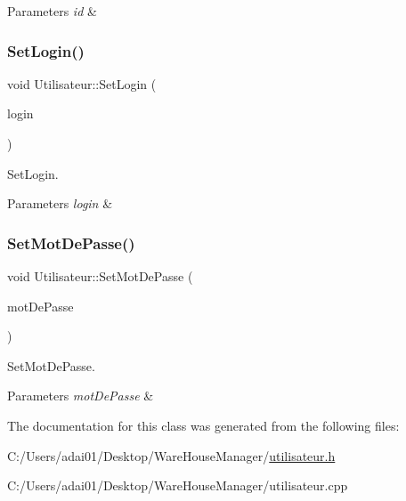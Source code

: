 \begin{DoxyParams}{Parameters}
{\em id} & \\
\hline
\end{DoxyParams}
\mbox{\label{class_utilisateur_a0bf37c85322764c3b094acd66aacec64}} 
\subsubsection{\texorpdfstring{Set\+Login()}{SetLogin()}}
{\footnotesize\ttfamily void Utilisateur\+::\+Set\+Login (\begin{DoxyParamCaption}\item[{Q\+String}]{login }\end{DoxyParamCaption})}



Set\+Login. 


\begin{DoxyParams}{Parameters}
{\em login} & \\
\hline
\end{DoxyParams}
\mbox{\label{class_utilisateur_a64504a89dd26ab7529305ea8d98460e5}} 
\subsubsection{\texorpdfstring{Set\+Mot\+De\+Passe()}{SetMotDePasse()}}
{\footnotesize\ttfamily void Utilisateur\+::\+Set\+Mot\+De\+Passe (\begin{DoxyParamCaption}\item[{Q\+String}]{mot\+De\+Passe }\end{DoxyParamCaption})}



Set\+Mot\+De\+Passe. 


\begin{DoxyParams}{Parameters}
{\em mot\+De\+Passe} & \\
\hline
\end{DoxyParams}


The documentation for this class was generated from the following files\+:\begin{DoxyCompactItemize}
\item 
C\+:/\+Users/adai01/\+Desktop/\+Ware\+House\+Manager/\mbox{\hyperlink{utilisateur_8h}{utilisateur.\+h}}\item 
C\+:/\+Users/adai01/\+Desktop/\+Ware\+House\+Manager/utilisateur.\+cpp\end{DoxyCompactItemize}
